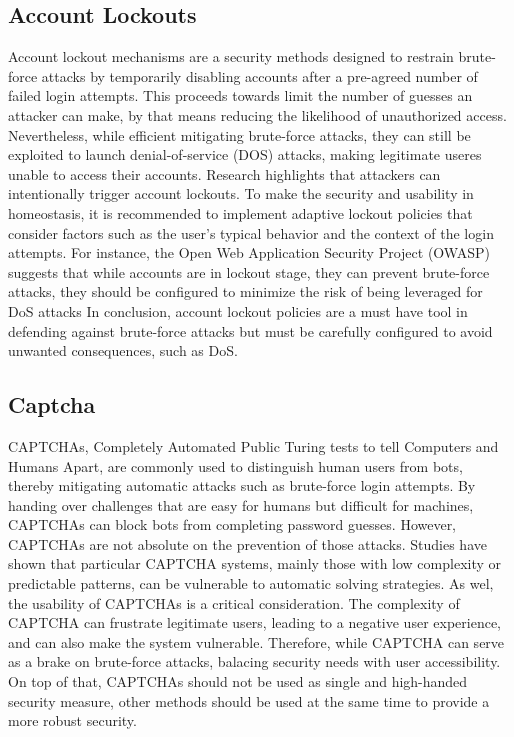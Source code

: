 \documentclass{comjnl}
\begin{document}
\subsection{Account Lockouts}
Account lockout mechanisms are a security methods designed to restrain brute-force attacks by temporarily disabling accounts after a pre-agreed number of failed login attempts. This proceeds towards limit the number of guesses an attacker can make, by that means reducing the likelihood of unauthorized access. Nevertheless, while efficient mitigating brute-force attacks, they can still be exploited to launch denial-of-service (DOS) attacks, making legitimate useres unable to access their accounts. Research highlights that attackers can intentionally trigger account lockouts.\cite{account_lockout_dos} To make the security and usability in homeostasis, it is recommended to implement adaptive lockout policies that consider factors such as the user's typical behavior and the context of the login attempts. For instance, the Open Web Application Security Project (OWASP) suggests that while accounts are in lockout stage, they can prevent brute-force attacks, they should be configured to minimize the risk of being leveraged for DoS attacks \cite{blocking_brute_force} In conclusion, account lockout policies are a must have tool in defending against brute-force attacks but must be carefully configured to avoid unwanted consequences, such as DoS.

\subsection{Captcha}
CAPTCHAs, Completely Automated Public Turing tests to tell Computers and Humans Apart, are commonly used to distinguish human users from bots, thereby mitigating automatic attacks such as brute-force login attempts. By handing over challenges that are easy for humans but difficult for machines, CAPTCHAs can block bots from completing password guesses. However, CAPTCHAs are not absolute on the prevention of those attacks. Studies have shown that particular CAPTCHA systems, mainly those with low complexity or predictable patterns, can be vulnerable to automatic solving strategies. \cite{captcha_description} As wel, the usability of CAPTCHAs is a critical consideration. The complexity of CAPTCHA can frustrate legitimate users, leading to a negative user experience, and can also make the system vulnerable. Therefore, while CAPTCHA can serve as a brake on brute-force attacks, balacing security needs with user accessibility. On top of that, CAPTCHAs should not be used as single and high-handed security measure, other methods should be used at the same time to provide a more robust security. \cite{captcha_types} 
\end{document}
